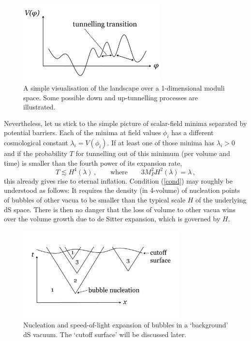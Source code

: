\documentclass[12pt]{article}
\newcommand{\be}{\begin{equation}}
\newcommand{\ee}{\end{equation}}
\numberwithin{equation}{section}
\begin{document}
\begin{figure}[ht]
\begin{center} 
\includegraphics[width=7.5cm]{tunnelling.png}
\caption{A simple visualisation of the landscape over a 1-dimensional moduli space. Some possible down and up-tunnelling processes are illustrated.}
\label{tunnelling} 
\end{center}
\end{figure}

Nevertheless, let us stick to the simple picture of scalar-field minima separated by potential barriers. Each of the minima at field values $\phi_i$ has a different cosmological constant $\lambda_i=V(\phi_i)$. If at least one of those minima has $\lambda_i>0$ and if the probability $T$ for tunnelling out of this minimum (per volume and time) is smaller than the fourth power of its expansion rate,
\be
T\lesssim H^4(\lambda)\,,\qquad \mbox{where}\qquad 3 M_P^2 H^2(\lambda) = \lambda\,,
\label{cond}
\ee
this already gives rise to eternal inflation. Condition (\ref{cond}) may roughly be understood as follows: It requires the density (in 4-volume) of nucleation points of bubbles of other vacua to be smaller than the typical scale $H$ of the underlying dS space. There is then no danger that the loss of volume to other vacua wins over the volume growth due to de Sitter expansion, which is governed by $H$.

\begin{figure}[ht]
\begin{center} 
\includegraphics[width=8.5cm]{ds.png}
\caption{Nucleation and speed-of-light expansion of bubbles in a `background' dS vacuum. The `cutoff surface' will be discussed later.}
\label{ds} 
\end{center}
\end{figure}
\end{document}
